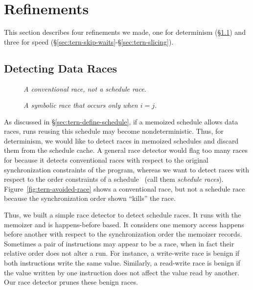 \section{Refinements} \label{sec:tern-impl}

This section describes four refinements we made, one for
determinism (\S\ref{sec:tern-detect-race}) and three for speed
(\S\ref{sec:tern-skip-waits}-\S\ref{sec:tern-slicing}).

\subsection{Detecting Data Races} \label{sec:tern-detect-race}

\begin{figure}
\begin{minipage}[t]{0.45\linewidth}
\tiny
{}
\caption{\small\em A conventional race, not a schedule race.}
\label{fig:tern-avoided-race}
\end{minipage}
\hfill
\begin{minipage}[t]{0.48\linewidth}
\tiny 
{}
\vspace{-.2in}
\caption{\small\em A symbolic race that occurs only when $i=j$.}
\label{fig:tern-symbolic-race}
\end{minipage}
\vspace{-.2in}
\end{figure}

As discussed in \S\ref{sec:tern-define-schedule}, if a memoized schedule allows
data races, runs reusing this schedule may become nondeterministic.  Thus,
for determinism, we would like to detect races in memoized schedules and
discard them from the schedule cache.  A general race detector would flag
too many races for \tern because it detects conventional races with respect
to the original synchronization constraints of the program, whereas we
want to detect races with respect to the order constraints of a
schedule~\cite{recplay:tocs} (call them \emph{schedule races}).
Figure~\ref{fig:tern-avoided-race} shows a conventional race, but not a
schedule race because the synchronization order shown ``kills'' the race.

Thus, we built a simple race detector to detect schedule races.  It runs
with the memoizer and is happens-before based.  It considers one memory
access happens before another with respect to the synchronization order
the memoizer records.  Sometimes a pair of instructions may appear to be a
race, when in fact their relative order does not alter a run.  For
instance, a write-write race is benign if both instructions write the same
value.  Similarly, a read-write race is benign if the value written by one
instruction does not affect the value read by another.  Our race detector
prunes these benign races.

